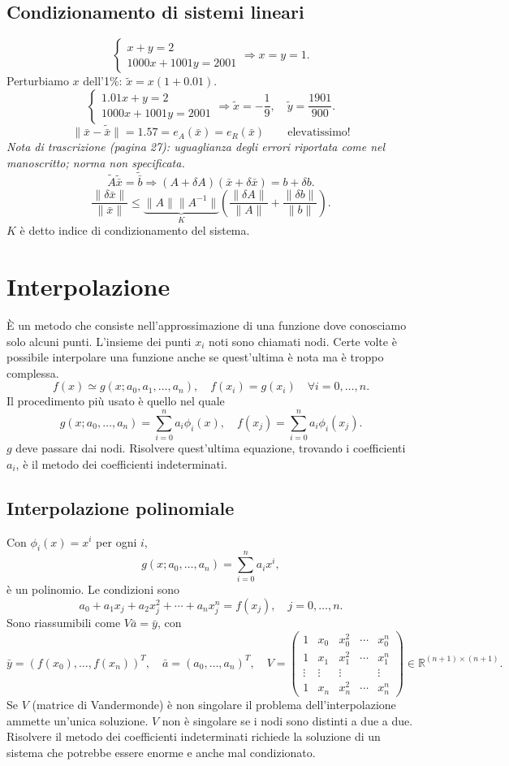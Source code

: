\documentclass[11pt,a4paper]{article}
\newcommand{\R}{\mathbb R}\newcommand{\F}{\mathbb F}\newcommand{\tr}{\operatorname{tr}}\newcommand{\ar}{\operatorname{arr}}\newcommand{\fl}{\operatorname{fl}}
\newcommand{\pagina}[1]{\clearpage}
\begin{document}
\subsection*{Condizionamento di sistemi lineari}
\[\begin{cases}x+y=2\\1000x+1001y=2001\end{cases}\Longrightarrow x=y=1.\]
Perturbiamo $x$ dell'1\%: $\widetilde x=x(1+0.01)$.
\[\begin{cases}1.01x+y=2\\1000x+1001y=2001\end{cases}\Longrightarrow\widetilde x=-\frac19,\quad\widetilde y=\frac{1901}{900}.\]
\[\|\bar x-\widetilde{\bar x}\|=1.57=e_A(\bar x)=e_R(\bar x)\qquad\text{elevatissimo!}\]
\textit{Nota di trascrizione (pagina 27): uguaglianza degli errori riportata come nel manoscritto; norma non specificata.}
\[\widetilde A\widetilde{\bar x}=\widetilde{\bar b}\Longrightarrow(A+\delta A)(\bar x+\delta\bar x)=b+\delta b.\]
\[\frac{\|\delta\bar x\|}{\|\bar x\|}\le\underbrace{\|A\|\|A^{-1}\|}_{K}\left(\frac{\|\delta A\|}{\|A\|}+\frac{\|\delta b\|}{\|b\|}\right).\]
$K$ è detto indice di condizionamento del sistema.
\pagina{28}\section{Interpolazione}
È un metodo che consiste nell'approssimazione di una funzione dove conosciamo solo alcuni punti. L'insieme dei punti $x_i$ noti sono chiamati nodi. Certe volte è possibile interpolare una funzione anche se quest'ultima è nota ma è troppo complessa.
\[f(x)\simeq g(x;a_0,a_1,\ldots,a_n),\quad f(x_i)=g(x_i)\quad\forall i=0,\ldots,n.\]
Il procedimento più usato è quello nel quale
\[g(x;a_0,\ldots,a_n)=\sum_{i=0}^n a_i\phi_i(x),\quad f(x_j)=\sum_{i=0}^na_i\phi_i(x_j).\]
$g$ deve passare dai nodi. Risolvere quest'ultima equazione, trovando i coefficienti $a_i$, è il metodo dei coefficienti indeterminati.
\subsection*{Interpolazione polinomiale}
Con $\phi_i(x)=x^i$ per ogni $i$,
\[g(x;a_0,\ldots,a_n)=\sum_{i=0}^n a_ix^i,\]
è un polinomio. Le condizioni sono
\[a_0+a_1x_j+a_2x_j^2+\cdots+a_nx_j^n=f(x_j),\quad j=0,\ldots,n.\]
Sono riassumibili come $V\bar a=\bar y$, con
\[\bar y=(f(x_0),\ldots,f(x_n))^T,\quad\bar a=(a_0,\ldots,a_n)^T,\quad V=\begin{pmatrix}1&x_0&x_0^2&\cdots&x_0^n\\1&x_1&x_1^2&\cdots&x_1^n\\\vdots&\vdots&\vdots&&\vdots\\1&x_n&x_n^2&\cdots&x_n^n\end{pmatrix}\in\R^{(n+1)\times(n+1)}.\]
\pagina{29}
Se $V$ (matrice di Vandermonde) è non singolare il problema dell'interpolazione ammette un'unica soluzione. $V$ non è singolare se i nodi sono distinti a due a due. Risolvere il metodo dei coefficienti indeterminati richiede la soluzione di un sistema che potrebbe essere enorme e anche mal condizionato.
\end{document}
